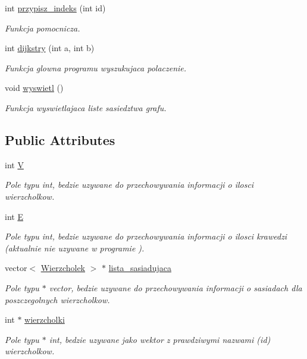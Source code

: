 \begin{DoxyCompactItemize}
int \hyperlink{class_graf_ae3cb2f3d4a8c9cc67845eacacf6a612d}{przypisz\-\_\-indeks} (int id)
\begin{DoxyCompactList}\small\item\em Funkcja pomocnicza. \end{DoxyCompactList}\item 
int \hyperlink{class_graf_ad85c82918ac15887c9e423cd4edb1dba}{dijkstry} (int a, int b)
\begin{DoxyCompactList}\small\item\em Funkcja glowna programu wyszukujaca polaczenie. \end{DoxyCompactList}\item 
void \hyperlink{class_graf_a3a084b33cfcfa17bbfc05570043aaab2}{wyswietl} ()
\begin{DoxyCompactList}\small\item\em Funkcja wyswietlajaca liste sasiedztwa grafu. \end{DoxyCompactList}\end{DoxyCompactItemize}
\subsection*{Public Attributes}
\begin{DoxyCompactItemize}
\item 
int \hyperlink{class_graf_a673185b62d4c232bcbbc0200e95e7481}{V}
\begin{DoxyCompactList}\small\item\em Pole typu int, bedzie uzywane do przechowywania informacji o ilosci wierzcholkow. \end{DoxyCompactList}\item 
int \hyperlink{class_graf_a30dc3bf4726fbd2d056c98f15080b236}{E}
\begin{DoxyCompactList}\small\item\em Pole typu int, bedzie uzywane do przechowywania informacji o ilosci krawedzi (aktualnie nie uzywane w programie ). \end{DoxyCompactList}\item 
vector$<$ \hyperlink{class_wierzcholek}{Wierzcholek} $>$ $\ast$ \hyperlink{class_graf_adf576dd4fd3cb35f4328a66befaa9c7a}{lista\-\_\-sasiadujaca}
\begin{DoxyCompactList}\small\item\em Pole typu $\ast$ vector, bedzie uzywane do przechowywania informacji o sasiadach dla poszczegolnych wierzcholkow. \end{DoxyCompactList}\item 
int $\ast$ \hyperlink{class_graf_a2df9c551c0ed169e20bdfe06aba56558}{wierzcholki}
\begin{DoxyCompactList}\small\item\em Pole typu $\ast$ int, bedzie uzywane jako wektor z prawdziwymi nazwami (id) wierzcholkow. \end{DoxyCompactList}\end{DoxyCompactItemize}


